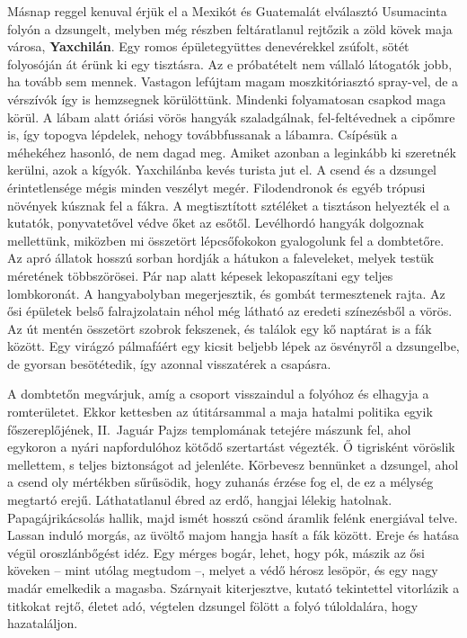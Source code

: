Másnap reggel kenuval érjük el a Mexikót és Guatemalát elválasztó
Usumacinta folyón a dzsungelt, melyben még részben feltáratlanul rejtőzik
a zöld kövek maja városa, \textbf{Yaxchilán}. Egy romos épületegyüttes
denevérekkel zsúfolt, sötét folyosóján át érünk ki egy tisztásra. Az e
próbatételt nem vállaló látogatók jobb, ha tovább sem mennek. Vastagon
lefújtam magam moszkitóriasztó spray-vel, de a vérszívók így is
hemzsegnek körülöttünk. Mindenki folyamatosan csapkod maga körül.
A lábam alatt óriási vörös hangyák szaladgálnak, fel-feltévednek
a cipőmre is, így topogva lépdelek, nehogy továbbfussanak a lábamra.
Csípésük a méhekéhez hasonló, de nem dagad meg. Amiket azonban
a leginkább ki szeretnék kerülni, azok a kígyók. Yaxchilánba kevés
turista jut el. A csend és a dzsungel érintetlensége mégis minden veszélyt
megér. Filodendronok és egyéb trópusi növények kúsznak fel a fákra.
A megtisztított sztéléket a tisztáson helyezték el a kutatók, ponyvatetővel
védve őket az esőtől. Levélhordó hangyák dolgoznak mellettünk,
miközben mi összetört lépcsőfokokon gyalogolunk fel a dombtetőre.
Az apró állatok hosszú sorban hordják a hátukon a faleveleket, melyek
testük méretének többszörösei. Pár nap alatt képesek lekopaszítani
egy teljes lombkoronát. A hangyabolyban megerjesztik, és gombát termesztenek
rajta. Az ősi épületek belső falrajzolatain néhol még látható
az eredeti színezésből a vörös. Az út mentén összetört szobrok fekszenek,
és találok egy kő naptárat is a fák között. Egy virágzó pálmafáért
egy kicsit beljebb lépek az ösvényről a dzsungelbe, de gyorsan besötétedik,
így azonnal visszatérek a csapásra.

A dombtetőn megvárjuk, amíg a csoport visszaindul a folyóhoz
és elhagyja a romterületet. Ekkor kettesben az útitársammal a maja
hatalmi politika egyik főszereplőjének, II.~Jaguár Pajzs templomának
tetejére mászunk fel, ahol egykoron a nyári napfordulóhoz kötődő
szertartást végezték. Ő tigrisként vöröslik mellettem, s teljes biztonságot
ad jelenléte. Körbevesz bennünket a dzsungel, ahol a csend oly
mértékben sűrűsödik, hogy zuhanás érzése fog el, de ez a mélység
megtartó erejű. Láthatatlanul ébred az erdő, hangjai lélekig hatolnak.
Papagájrikácsolás hallik, majd ismét hosszú csönd áramlik felénk
energiával telve. Lassan induló morgás, az üvöltő majom hangja hasít
a fák között. Ereje és hatása végül oroszlánbőgést idéz. Egy mérges
bogár, lehet, hogy pók, mászik az ősi köveken -- mint utólag megtudom --,
melyet a védő hérosz lesöpör, és egy nagy madár emelkedik a
magasba. Szárnyait kiterjesztve, kutató tekintettel vitorlázik a titkokat
rejtő, életet adó, végtelen dzsungel fölött a folyó túloldalára, hogy
hazataláljon.

